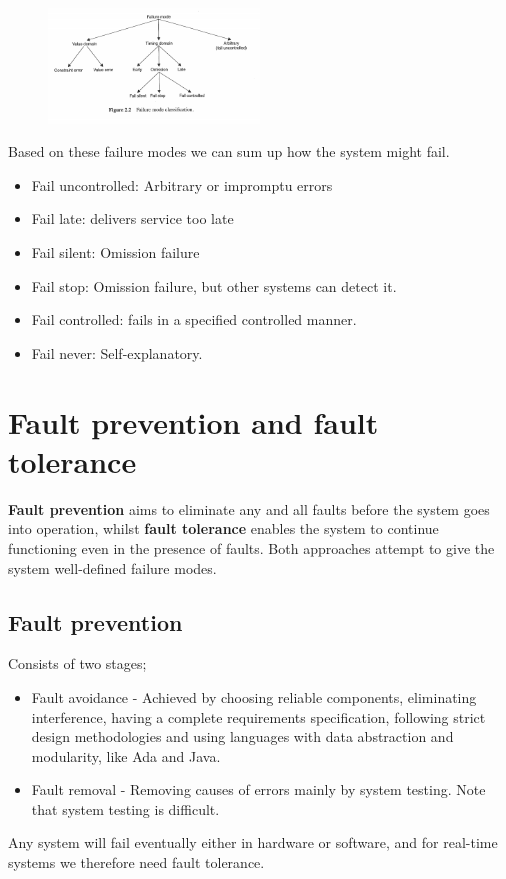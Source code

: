 \begin{figure}[H]
\centering
\includegraphics[width=0.5\textwidth]{figures/Fault_Tolerance/failure_mode_classification.PNG}
\end{figure}

Based on these failure modes we can sum up how the system might fail.
\begin{itemize}
\item Fail uncontrolled: Arbitrary or impromptu errors
\item Fail late: delivers service too late
\item Fail silent: Omission failure
\item Fail stop: Omission failure, but other systems can detect it.
\item Fail controlled: fails in a specified controlled manner.
\item Fail never: Self-explanatory.
\end{itemize}

\section{Fault prevention and fault tolerance}
\textbf{Fault prevention} aims to eliminate any and all faults before the system goes into operation, whilst \textbf{fault tolerance} enables the system to continue functioning even in the presence of faults. Both approaches attempt to give the system well-defined failure modes.

\subsection{Fault prevention}
Consists of two stages;
\begin{itemize}
\item Fault avoidance - Achieved by choosing reliable components, eliminating interference, having a complete requirements specification, following strict design methodologies and using languages with data abstraction and modularity, like Ada and Java.
\item Fault removal - Removing causes of errors mainly by system testing. Note that system testing is difficult. 
\end{itemize}
Any system will fail eventually either in hardware or software, and for real-time systems we therefore need fault tolerance.

